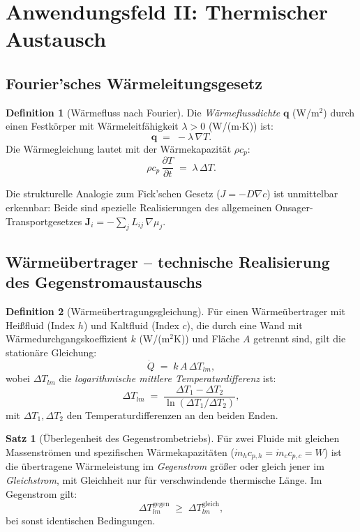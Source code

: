 ﻿\documentclass[a4paper,12pt]{article}
\theoremstyle{definition}
\newtheorem{definition}{Definition}
\newtheorem{satz}{Satz}
\begin{document}
\section{Anwendungsfeld II: Thermischer Austausch}

\subsection{Fourier'sches Wärmeleitungsgesetz}

\begin{definition}[Wärmefluss nach Fourier]
    Die \emph{Wärmefluss\-dichte} $\mathbf{q}$ (W/m$^2$) durch einen Festkörper
    mit Wärmeleitfähigkeit $\lambda > 0$ (W/(m$\cdot$K)) ist:
    \[
        \mathbf{q} \;=\; -\lambda\,\nabla T.
    \]
    Die Wärmegleichung lautet mit der Wärmekapazität $\rho c_p$:
    \[
        \rho c_p \,\frac{\partial T}{\partial t} \;=\; \lambda\,\Delta T.
    \]
\end{definition}

Die strukturelle Analogie zum Fick'schen Gesetz ($J = -D\nabla c$) ist unmittelbar
erkennbar: Beide sind spezielle Realisierungen des allgemeinen Onsager-Transportgesetzes
$\mathbf{J}_i = -\sum_j L_{ij}\,\nabla\mu_j$.

\subsection{Wärmeübertrager -- technische Realisierung des Gegenstromaustauschs}

\begin{definition}[Wärmeübertragungsgleichung]
    Für einen Wärmeübertrager mit Heißfluid (Index $h$) und Kaltfluid (Index $c$),
    die durch eine Wand mit Wärmedurchgangskoeffizient $k$ (W/(m$^2$K)) und
    Fläche $A$ getrennt sind, gilt die stationäre Gleichung:
    \[
        \dot{Q} \;=\; k\,A\,\Delta T_{lm},
    \]
    wobei $\Delta T_{lm}$ die \emph{logarithmische mittlere Temperaturdifferenz} ist:
    \[
        \Delta T_{lm} \;=\; \frac{\Delta T_1 - \Delta T_2}{\ln(\Delta T_1/\Delta T_2)},
    \]
    mit $\Delta T_1, \Delta T_2$ den Temperaturdifferenzen an den beiden Enden.
\end{definition}

\begin{satz}[Überlegenheit des Gegenstrombetriebs]
    Für zwei Fluide mit gleichen Massenströmen und spezifischen Wärmekapazitäten
    ($\dot{m}_h c_{p,h} = \dot{m}_c c_{p,c} = W$) ist die übertragene Wärmeleistung
    im \emph{Gegenstrom} größer oder gleich jener im \emph{Gleichstrom}, mit
    Gleichheit nur für verschwindende thermische Länge.
    Im Gegenstrom gilt:
    \[
        \Delta T_{lm}^{\text{gegen}} \;\geq\; \Delta T_{lm}^{\text{gleich}},
    \]
    bei sonst identischen Bedingungen.
\end{satz}
\end{document}
